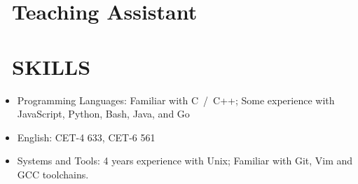 \documentclass{resume}
\begin{document}
\section{\faBook\ Teaching Assistant}

\section{\faCogs\ SKILLS}
\begin{itemize}[parsep=1.0ex]
  \item Programming Languages: Familiar with C\ /\ C++; Some experience with JavaScript, Python, Bash, Java, and Go
  \item English: CET-4 633, CET-6 561
  \item Systems and Tools: 4 years experience with Unix; Familiar with Git, Vim and GCC toolchains.
\end{itemize}
\end{document}
